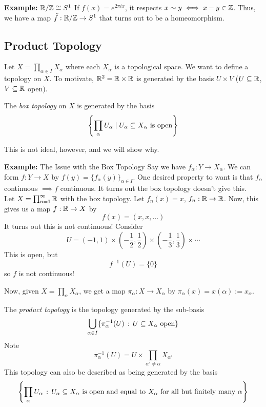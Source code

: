 \begin{example}{\textbf{Example:} $\R/\Z \cong S^1$}
    If $f(x) = e^{2\pi ix}$, it respects $x \sim y \iff x - y \in \Z$. Thus, we have a map $\tilde{f} : \R/\Z \to S^1$ that turns out to be a homeomorphism.
\end{example}

\subsection*{Product Topology}
\sectionspace

Let $X = \prod_{\alpha \in I} X_{\alpha}$ where each $X_{\alpha}$ is a topological space. We want to define a topology on $X$. To motivate, $\R^2 = \R \times \R$ is generated by the basis $U \times V$ ($U \subseteq \R$, $V \subseteq \R$ open).

\begin{definition}
    The \emph{box topology} on $X$ is generated by the basis
    \[ \left\{\prod_{\alpha} U_{\alpha} \mid U_{\alpha} \subseteq X_{\alpha} \tt{ is open}\right\} \]
\end{definition}

This is not ideal, however, and we will show why.

\begin{example}{\textbf{Example:} The Issue with the Box Topology}
    Say we have $f_{\alpha} : Y \to X_{\alpha}$. We can form $f : Y \to X$ by $f(y) = \{f_{\alpha}(y)\}_{\alpha \in I}$. One desired property to want is that $f_{\alpha}$ continuous $\implies f$ continuous. It turns out the box topology doesn't give this.\\

    Let $X = \prod_{n = 1}^{\infty} \R$ with the box topology. Let $f_n(x) = x$, $f_n : \R \to \R$. Now, this gives us a map $f : \R \to X$ by
    \[ f(x) = (x, x, \ldots) \]
    It turns out this is not continuous! Consider
    \[ U = (-1, 1) \times \left(-\frac{1}{2}, \frac{1}{2}\right) \times \left(-\frac{1}{3}, \frac{1}{3}\right) \times \cdots \]
    This is open, but
    \[ f^{-1}(U) = \{0\} \]
    so $f$ is not continuous!
\end{example}

Now, given $X = \prod_{\alpha} X_{\alpha}$, we get a map $\pi_{\alpha} : X \to X_{\alpha}$ by $\pi_{\alpha}(x) = x(\alpha) := x_{\alpha}$.

\begin{definition}
    The \emph{product topology} is the topology generated by the sub-basis
    \[ \bigcup_{\alpha \in I}\{\pi_{\alpha}^{-1}(U) \col U \subseteq X_{\alpha} \tt{ open}\} \]
    Note
    \[ \pi_{\alpha}^{-1}(U) = U \times \prod_{\alpha' \neq \alpha} X_{\alpha'} \]
    This topology can also be described as being generated by the basis
    \[ \left\{\prod_{\alpha} U_{\alpha} \col U_{\alpha} \subseteq X_{\alpha} \tt{ is open and equal to } X_{\alpha} \tt{ for all but finitely many } \alpha\right\} \]
\end{definition}

